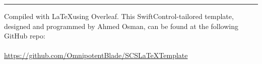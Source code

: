 \documentclass[12pt]{article}
\begin{document}
 





\fancyfoot{}

\rfoot{\thepage}

\newpage
\tableofcontents
\vfill
\noindent\rule{\textwidth}{0.5pt}\vspace{0.1in}
\noindent\small{Compiled with \LaTeX\text{ }using Overleaf. This SwiftControl-tailored template, designed and programmed by Ahmed Osman, can be found at the following GitHub repo:
\\\\\href{https://github.com/OmnipotentBlade/SCSLaTeXTemplate}{https://github.com/OmnipotentBlade/SCSLaTeXTemplate}}
\newpage
{}






 
\end{document}
